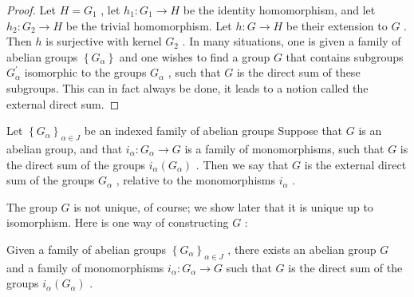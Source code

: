 \begin{proof}Let \(H = {G}_{1}\) , let \({h}_{1} : {G}_{1} \rightarrow  H\) be the identity homomorphism, and let \({h}_{2} : {G}_{2} \rightarrow  H\) be the trivial homomorphism. Let \(h : G \rightarrow  H\) be their extension to \(G\) . Then \(h\) is surjective with kernel \({G}_{2}\) .
In many situations, one is given a family of abelian groups \(\left\{  {G}_{\alpha }\right\}\) and one wishes to find a group \(G\) that contains subgroups \({G}_{\alpha }^{\prime }\) isomorphic to the groups \({G}_{\alpha }\) , such that \(G\) is the direct sum of these subgroups. This can in fact always be done, it leads to a notion called the external direct sum.
\end{proof}
\begin{definition} Let \({\left\{  {G}_{\alpha }\right\}  }_{\alpha  \in  J}\) be an indexed family of abelian groups Suppose that \(G\) is an abelian group, and that \({i}_{\alpha } : {G}_{\alpha } \rightarrow  G\) is a family of monomorphisms, such that \(G\) is the direct sum of the groups \({i}_{\alpha }\left( {G}_{\alpha }\right)\) . Then we say that \(G\) is the external direct sum of the groups \({G}_{\alpha }\) , relative to the monomorphisms \({i}_{\alpha }\) .
\end{definition}

The group \(G\) is not unique, of course; we show later that it is unique up to isomorphism. Here is one way of constructing \(G\) :

\begin{theorem} Given a family of abelian groups \({\left\{  {G}_{\alpha }\right\}  }_{\alpha  \in  J}\) , there exists an abelian group \(G\) and a family of monomorphisms \({i}_{\alpha } : {G}_{\alpha } \rightarrow  G\) such that \(G\) is the direct sum of the groups \({i}_{\alpha }\left( {G}_{\alpha }\right)\) .
\end{theorem}

